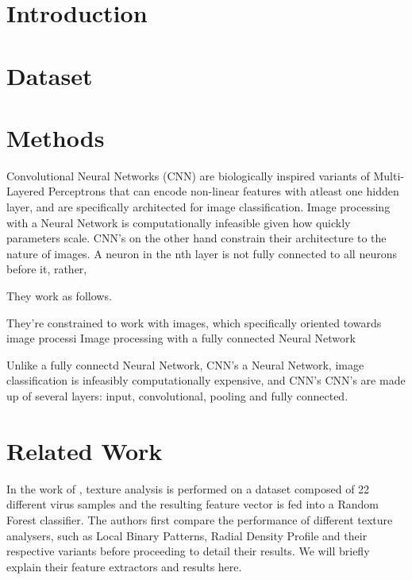\begin{multicols}{2}
\section{Introduction}
\section{Dataset}
\label{text:dataset}


\section{Methods}
Convolutional Neural Networks (CNN) are biologically inspired variants of Multi-Layered Perceptrons that can encode non-linear features with atleast one hidden layer, and are specifically architected for image classification. Image processing with a Neural Network is computationally infeasible given how quickly parameters scale. CNN's on the other hand constrain their architecture to the nature of images. A neuron in the nth layer is not fully connected to all neurons before it, rather, 


They work as follows. 

 They're constrained to work with images, which specifically oriented towards image processi Image processing with a fully connected Neural Network 

Unlike a fully connectd Neural Network, CNN's  a Neural Network, image classification is infeasibly computationally expensive, and CNN's  CNN's are made up of several layers: input, convolutional, pooling and fully connected.  

\section{Related Work}
In the work of \citet{kylberg2011virus}, texture analysis is performed on a dataset composed of 22 different  virus samples and the resulting feature vector is fed into a Random Forest classifier. The authors first compare the performance of different texture analysers, such as Local Binary Patterns, Radial Density Profile and their respective variants before proceeding to detail their results. We will briefly explain their feature extractors and results here. 

\end{multicols}

